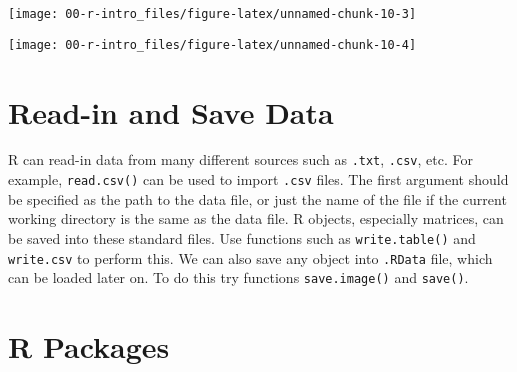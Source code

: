 \documentclass[
]{article}
\newenvironment{Shaded}{\begin{snugshade}}{\end{snugshade}}
\newcommand{\CommentTok}[1]{\textcolor[rgb]{0.56,0.35,0.01}{\textit{#1}}}
\newcommand{\DataTypeTok}[1]{\textcolor[rgb]{0.13,0.29,0.53}{#1}}
\newcommand{\DecValTok}[1]{\textcolor[rgb]{0.00,0.00,0.81}{#1}}
\newcommand{\FloatTok}[1]{\textcolor[rgb]{0.00,0.00,0.81}{#1}}
\newcommand{\KeywordTok}[1]{\textcolor[rgb]{0.13,0.29,0.53}{\textbf{#1}}}
\newcommand{\NormalTok}[1]{#1}
\newcommand{\OperatorTok}[1]{\textcolor[rgb]{0.81,0.36,0.00}{\textbf{#1}}}
\newcommand{\OtherTok}[1]{\textcolor[rgb]{0.56,0.35,0.01}{#1}}
\newcommand{\StringTok}[1]{\textcolor[rgb]{0.31,0.60,0.02}{#1}}
\begin{document}
\begin{center}\texttt{[image: 00-r-intro\_files/figure-latex/unnamed-chunk-10-3]} \end{center}

\begin{Shaded}
\end{Shaded}

\begin{center}\texttt{[image: 00-r-intro\_files/figure-latex/unnamed-chunk-10-4]} \end{center}

\hypertarget{read-in-and-save-data}{%
\section{Read-in and Save Data}\label{read-in-and-save-data}}

R can read-in data from many different sources such as \texttt{.txt},
\texttt{.csv}, etc. For example, \texttt{read.csv()} can be used to
import \texttt{.csv} files. The first argument should be specified as
the path to the data file, or just the name of the file if the current
working directory is the same as the data file. R objects, especially
matrices, can be saved into these standard files. Use functions such as
\texttt{write.table()} and \texttt{write.csv} to perform this. We can
also save any object into \texttt{.RData} file, which can be loaded
later on. To do this try functions \texttt{save.image()} and
\texttt{save()}.

\hypertarget{r-packages}{%
\section{R Packages}\label{r-packages}}
\end{document}
